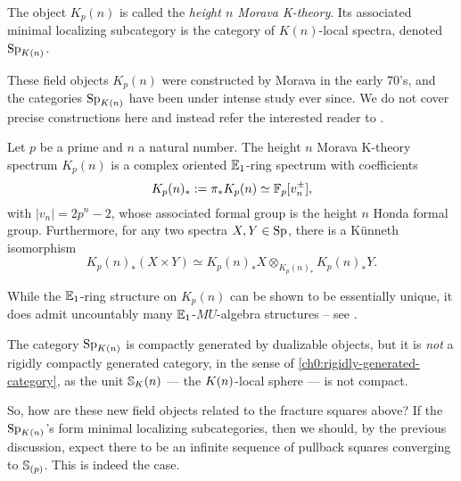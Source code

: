 \begin{notation}
    The object $K_p(n)$ is called the \emph{height $n$ Morava K-theory}. Its associated minimal localizing subcategory is the category of $K(n)$-local spectra, denoted $\SpK$.  
\end{notation}

These field objects $K_p(n)$ were constructed by Morava in the early 70's, and the categories $\SpK$ have been under intense study ever since. We do not cover precise constructions here and instead refer the interested reader to \cite{hovey-strickland_99}. 

\begin{proposition}
    \label{ch0:prop:properties-of-K(n)}
    Let $p$ be a prime and $n$ a natural number. The height $n$ Morava K-theory spectrum $K_p(n)$ is a complex oriented $\E_1$-ring spectrum with coefficients 
    $$K_p(n)_*:=\pi_* K_p(n) \simeq \F_p[v_n^{\pm}],$$ 
    with $|v_n|=2p^n-2$, whose associated formal group is the height $n$ Honda formal group. Furthermore, for any two spectra $X, Y\in \sp$, there is a Künneth isomorphism 
    $$K_p(n)_*(X\times Y)\simeq K_p(n)_*X\otimes_{K_p(n)_*} K_p(n)_*Y.$$
\end{proposition}

\begin{remark}
    While the $\E_1$-ring structure on $K_p(n)$ can be shown to be essentially unique, it does admit uncountably many $\E_1$-$MU$-algebra structures -- see \cite{angeltveit_2011}. 
\end{remark}

\begin{remark}
    \label{ch0:rm:SpKn-not-rigidly-generated}
    The category $\SpK$ is compactly generated by dualizable objects, but it is \emph{not} a rigidly compactly generated category, in the sense of \cref{ch0:rigidly-generated-category}, as the unit $\S_\Kn$ --- the $\Kn$-local sphere --- is not compact.  
\end{remark}

So, how are these new field objects related to the fracture squares above? If the $\SpK$'s form minimal localizing subcategories, then we should, by the previous discussion, expect there to be an infinite sequence of pullback squares converging to $\S_{(p)}$. This is indeed the case. 

